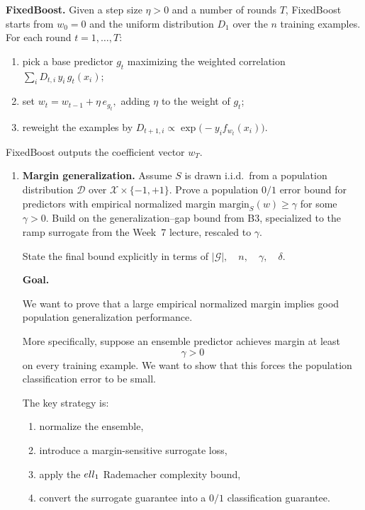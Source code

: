 \documentclass[11pt]{article}
\begin{document}
\medskip
\noindent\textbf{FixedBoost.}
Given a step size $\eta > 0$ and a number of rounds $T$, FixedBoost starts from 
$w_0 = 0$ and the uniform distribution $D_1$ over the $n$ training examples.  
For each round $t = 1,\ldots,T$:
\begin{enumerate}
    \item pick a base predictor $g_t$ maximizing the weighted correlation $\sum_i D_{t,i}\, y_i\, g_t(x_i);$
    \item set $w_t = w_{t-1} + \eta\, e_{g_t},$ adding $\eta$ to the weight of $g_t$;
    \item reweight the examples by $D_{t+1,i} \propto \exp\!\bigl(-y_i f_{w_t}(x_i)\bigr)$.
\end{enumerate}
FixedBoost outputs the coefficient vector $w_T$.
\begin{enumerate}
\item \textbf{ Margin generalization.}
\medskip
Assume $S$ is drawn i.i.d.\ from a population distribution $\mathcal{D}$ over 
$\mathcal{X} \times \{-1,+1\}$. Prove a population $0/1$ error bound for predictors 
with empirical normalized margin 
$
\mathrm{margin}_S(w) \ge \gamma
$
for some $\gamma > 0$. Build on the generalization--gap bound from B3, specialized to 
the ramp surrogate from the Week~7 lecture, rescaled to $\gamma$. 

State the final bound explicitly in terms of 
$
|\mathcal{G}|,\quad n,\quad \gamma,\quad \delta.
$

\begin{solutionbox}
\textbf{Goal.}

We want to prove that a large empirical normalized margin implies good population generalization performance.

More specifically, suppose an ensemble predictor achieves margin at least
\[
\gamma>0
\]
on every training example. We want to show that this forces the population classification error to be small.

The key strategy is:
\begin{enumerate}
    \item normalize the ensemble,
    \item introduce a margin-sensitive surrogate loss,
    \item apply the $\\ell_1$ Rademacher complexity bound,
    \item convert the surrogate guarantee into a $0/1$ classification guarantee.
\end{enumerate}


\end{solutionbox}
\end{enumerate}
\end{document}
